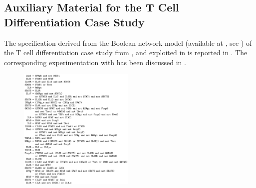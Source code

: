 \subsection{Auxiliary Material for the T Cell Differentiation Case Study}

The \BioResolve specification derived from the Boolean network model (available at \cite{ModelCellCollective}, see ) of the T cell differentiation case study from \cite{puniya2018mechanistic}, and exploited in \cite{datamod2023} is reported in . The corresponding experimentation with \GROOVE has been discussed in .




\begin{figure}[t]
	\begin{center}
		\includegraphics[width=0.49\textwidth]{figs-datamod2023/TcellBN.png}
	\end{center}

\end{figure}
